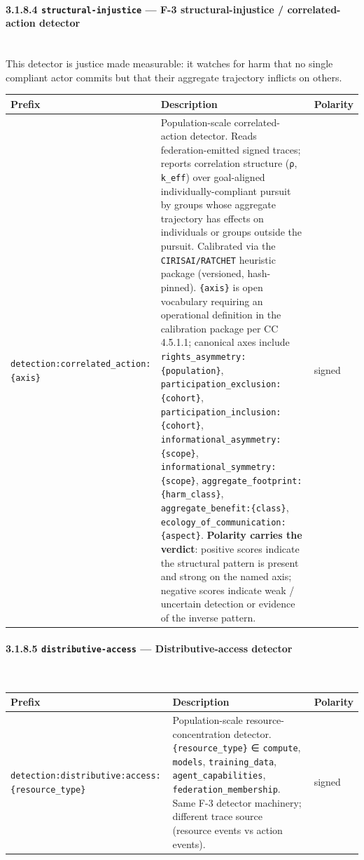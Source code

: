 \documentclass[11pt]{article}
\begin{document}
\paragraph{3.1.8.4 \texttt{structural-injustice} — F-3 structural-injustice / correlated-action detector}\mbox{}\\


This detector is justice made measurable: it watches for harm that no single compliant actor commits but that their aggregate trajectory inflicts on others.


{\footnotesize
\begin{longtable}{|p{5.33cm}|p{5.33cm}|p{5.33cm}|}\hline
\textbf{Prefix} & \textbf{Description} & \textbf{Polarity} \\ \hline\endhead
\texttt{detection:correlated\_action:\{axis\}} & Population-scale correlated-action detector. Reads federation-emitted signed traces; reports correlation structure (\texttt{ρ}, \texttt{k\_eff}) over goal-aligned individually-compliant pursuit by groups whose aggregate trajectory has effects on individuals or groups outside the pursuit. Calibrated via the \texttt{CIRISAI/RATCHET} heuristic package (versioned, hash-pinned). \texttt{\{axis\}} is open vocabulary requiring an operational definition in the calibration package per CC 4.5.1.1; canonical axes include \texttt{rights\_asymmetry:\{population\}}, \texttt{participation\_exclusion:\{cohort\}}, \texttt{participation\_inclusion:\{cohort\}}, \texttt{informational\_asymmetry:\{scope\}}, \texttt{informational\_symmetry:\{scope\}}, \texttt{aggregate\_footprint:\{harm\_class\}}, \texttt{aggregate\_benefit:\{class\}}, \texttt{ecology\_of\_communication:\{aspect\}}. \textbf{Polarity carries the verdict}: positive scores indicate the structural pattern is present and strong on the named axis; negative scores indicate weak / uncertain detection or evidence of the inverse pattern. & signed \\ \hline
\end{longtable}}


\paragraph{3.1.8.5 \texttt{distributive-access} — Distributive-access detector}\mbox{}\\


{\footnotesize
\begin{longtable}{|p{5.33cm}|p{5.33cm}|p{5.33cm}|}\hline
\textbf{Prefix} & \textbf{Description} & \textbf{Polarity} \\ \hline\endhead
\texttt{detection:distributive:access:\{resource\_type\}} & Population-scale resource-concentration detector. \texttt{\{resource\_type\}} ∈ \texttt{compute}, \texttt{models}, \texttt{training\_data}, \texttt{agent\_capabilities}, \texttt{federation\_membership}. Same F-3 detector machinery; different trace source (resource events vs action events). & signed \\ \hline
\end{longtable}}
\end{document}
